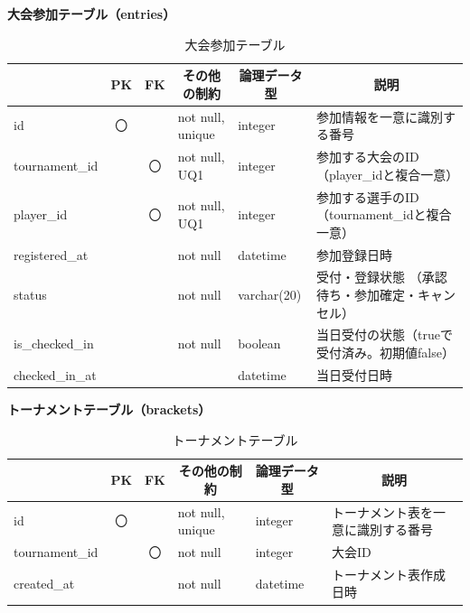 \noindent\textbf{大会参加テーブル（entries）}
\begin{table}[H]
    \centering
    \caption{大会参加テーブル}
    \label{tab:entries_table}
    \begin{tabularx}{\linewidth}{|l|c|c|l|l|X|}
        \hline
        \rowcolor{tableblue}
        \multicolumn{1}{|c|}{カラム名} & \multicolumn{1}{c|}{PK} & \multicolumn{1}{c|}{FK} & \multicolumn{1}{c|}{その他の制約} & \multicolumn{1}{c|}{論理データ型} & \multicolumn{1}{c|}{説明} \\ \hline
        id & 〇 & & not null, unique & integer & 参加情報を一意に識別する番号 \\ \hline
        tournament\_id & & 〇 & not null, UQ1 & integer & 参加する大会のID \newline（player\_idと複合一意） \\ \hline
        player\_id & & 〇 & not null, UQ1 & integer & 参加する選手のID \newline（tournament\_idと複合一意） \\ \hline
        registered\_at & & & not null & datetime & 参加登録日時 \\ \hline
        status & & & not null & varchar(20) & 受付・登録状態 \newline（承認待ち・参加確定・キャンセル） \\ \hline
        is\_checked\_in & & & not null & boolean & 当日受付の状態（trueで受付済み。初期値false） \\ \hline
        checked\_in\_at & & & & datetime & 当日受付日時 \\ \hline
    \end{tabularx}
\end{table}

\noindent\textbf{トーナメントテーブル（brackets）}
\begin{table}[H]
    \centering
    \caption{トーナメントテーブル}
    \label{tab:brackets_table}
    \begin{tabularx}{\linewidth}{|l|c|c|l|l|X|}
        \hline
        \rowcolor{tableblue}
        \multicolumn{1}{|c|}{カラム名} & \multicolumn{1}{c|}{PK} & \multicolumn{1}{c|}{FK} & \multicolumn{1}{c|}{その他の制約} & \multicolumn{1}{c|}{論理データ型} & \multicolumn{1}{c|}{説明} \\ \hline
        id & 〇 & & not null, unique & integer & トーナメント表を一意に識別する番号 \\ \hline
        tournament\_id & & 〇 & not null & integer & 大会ID \\ \hline
        created\_at & & & not null & datetime & トーナメント表作成日時 \\ \hline
    \end{tabularx}
\end{table}

